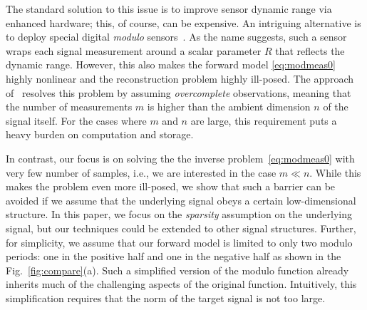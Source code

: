 The standard solution to this issue is to improve sensor dynamic range via enhanced hardware; this, of course, can be expensive. An intriguing alternative is to deploy special digital \emph{modulo} sensors~\cite{rheejoo,kavusi2004quantitative,sasagawa2016implantable,yamaguchi2016implantable}. As the name suggests, such a sensor wraps each signal measurement around a scalar parameter $R$ that reflects the dynamic range. However, this also makes the forward model \eqref{eq:modmeas0} highly nonlinear and the reconstruction problem highly ill-posed. The approach of~\cite{Bhandari,ICCP15_Zhao} resolves this problem by assuming \emph{overcomplete} observations, meaning that the number of measurements $m$ is higher than the ambient dimension $n$ of the signal itself. For the cases where $m$ and $n$ are large, this requirement puts a heavy burden on computation and storage. 

In contrast, our focus is on solving the the inverse problem~\eqref{eq:modmeas0} with very few number of samples, {i.e.}, we are interested in the case $m \ll n$. While this makes the problem even more ill-posed, we show that such a barrier can be avoided if we assume that the underlying signal obeys a certain low-dimensional structure. In this paper, we focus on the \emph{sparsity} assumption on the underlying signal, but our techniques could be extended to other signal structures. Further, for simplicity, we assume that our forward model is limited to only two modulo periods: one in the positive half and one in the negative half as shown in the Fig.~\ref{fig:compare}(a). Such a simplified version of the modulo function already inherits much of the challenging aspects of the original function. Intuitively, this simplification requires that the norm of the target signal is not too large. %

